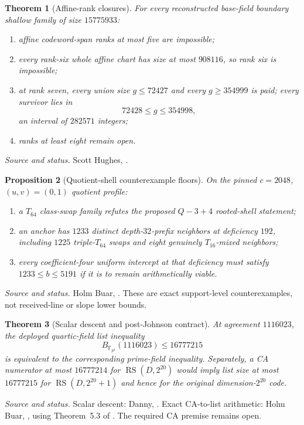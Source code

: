 \documentclass[11pt,a4paper]{amsart}
\numberwithin{equation}{section}
\newtheorem{theorem}{Theorem}[section]
\newtheorem{proposition}[theorem]{Proposition}
\theoremstyle{remark}
\DeclareMathOperator{\RS}{RS}
\newcommand{\F}{\mathbb F}
\newcommand{\source}[1]{\par\smallskip\noindent\textit{Source and status.} #1\par}
\begin{document}
\begin{theorem}[Affine-rank closures]\label{thm:m31-ranks}
For every reconstructed base-field boundary shallow family of size $15775933$:
\begin{enumerate}[label=\textup{(\roman*)},leftmargin=*]
\item affine codeword-span ranks at most five are impossible;
\item every rank-six whole affine chart has size at most $908116$, so rank six is impossible;
\item at rank seven, every union size $g\le72427$ and every $g\ge354999$ is paid; every survivor lies in
\[
 \boxed{72428\le g\le354998},
\]
an interval of $282571$ integers;
\item ranks at least eight remain open.
\end{enumerate}
\end{theorem}
\source{Scott Hughes, \cite{HughesM31Rank626,HughesM31Rank726}.}

\begin{proposition}[Quotient-shell counterexample floors]\label{prop:m31-shell}
On the pinned $c=2048$, $(u,v)=(0,1)$ quotient profile:
\begin{enumerate}[label=\textup{(\roman*)},leftmargin=*]
\item a $T_{64}$ class-swap family refutes the proposed $Q{-}3{+}4$ rooted-shell statement;
\item an anchor has $1233$ distinct depth-$32$-prefix neighbors at deficiency $192$, including $1225$ triple-$T_{64}$ swaps and eight genuinely $T_{16}$-mixed neighbors;
\item every coefficient-four uniform intercept at that deficiency must satisfy $1233\le b\le5191$ if it is to remain arithmetically viable.
\end{enumerate}
\end{proposition}
\source{Holm Buar, \cite{BuarM31Q6426,BuarM31Q1626}.  These are exact support-level counterexamples, not received-line or slope lower bounds.}

\begin{theorem}[Scalar descent and post-Johnson contract]\label{thm:m31-descent}
At agreement $1116023$, the deployed quartic-field list inequality
\[
 B_{\F_{p^4}}(1116023)\le16777215
\]
is equivalent to the corresponding prime-field inequality.  Separately, a CA numerator at most $16777214$ for $\RS(D,2^{20})$ would imply list size at most $16777215$ for $\RS(D,2^{20}+1)$ and hence for the original dimension-$2^{20}$ code.
\end{theorem}
\source{Scalar descent: Danny, \cite{DannyM31Descent26}.  Exact CA-to-list arithmetic: Holm Buar, \cite{BuarM31PostJohnson26}, using Theorem~5.3 of \cite{ABF26}.  The required CA premise remains open.}
\end{document}
